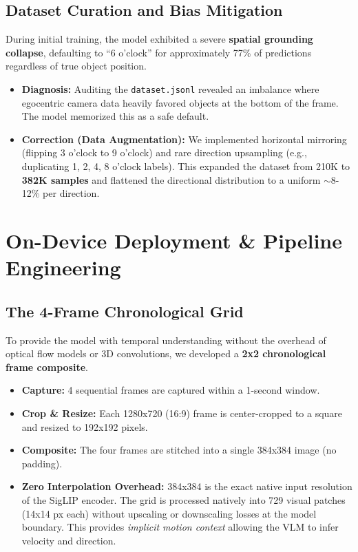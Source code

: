 \documentclass[11pt,a4paper]{article}
\begin{document}
\subsection{Dataset Curation and Bias Mitigation}
During initial training, the model exhibited a severe \textbf{spatial grounding collapse}, defaulting to ``6 o'clock'' for approximately 77\% of predictions regardless of true object position.
\begin{itemize}
    \item \textbf{Diagnosis:} Auditing the \texttt{dataset.jsonl} revealed an imbalance where egocentric camera data heavily favored objects at the bottom of the frame. The model memorized this as a safe default.
    \item \textbf{Correction (Data Augmentation):} We implemented horizontal mirroring (flipping 3 o'clock to 9 o'clock) and rare direction upsampling (e.g., duplicating 1, 2, 4, 8 o'clock labels). This expanded the dataset from 210K to \textbf{382K samples} and flattened the directional distribution to a uniform $\sim$8-12\% per direction.
\end{itemize}

\section{On-Device Deployment \& Pipeline Engineering}

\subsection{The 4-Frame Chronological Grid}
To provide the model with temporal understanding without the overhead of optical flow models or 3D convolutions, we developed a \textbf{2x2 chronological frame composite}.
\begin{itemize}
    \item \textbf{Capture:} 4 sequential frames are captured within a 1-second window.
    \item \textbf{Crop \& Resize:} Each 1280x720 (16:9) frame is center-cropped to a square and resized to 192x192 pixels.
    \item \textbf{Composite:} The four frames are stitched into a single 384x384 image (no padding).
    \item \textbf{Zero Interpolation Overhead:} 384x384 is the exact native input resolution of the SigLIP encoder. The grid is processed natively into 729 visual patches (14x14 px each) without upscaling or downscaling losses at the model boundary. This provides \textit{implicit motion context} allowing the VLM to infer velocity and direction.
\end{itemize}
\end{document}
